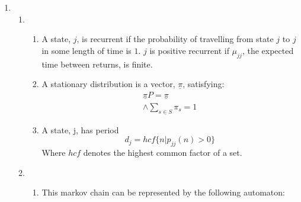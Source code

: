 \documentclass{article}
\begin{document}
\begin{enumerate}
\begin{enumerate}
\end{enumerate}
\clearpage
\item
\begin{enumerate}
\item
\begin{enumerate}
\item A state, $j$, is recurrent if the probability of travelling from state $j$
to $j$ in some length of time is $1$. $j$ is positive recurrent if $\mu_{jj}$,
the expected time between returns, is finite.

\item A stationary distribution is a vector, $\underline{\pi}$, satisfying:
\begin{align*}
\underline{\pi} P = \underline{\pi} \\
\wedge \sum_{s \in S} \pi_s = 1
\end{align*}
\item
A state, j, has period
$$
d_j = hcf\{n|p_{jj}(n)>0\}
$$
Where $hcf$ denotes the highest common factor of a set.
\end{enumerate}
\item
\begin{enumerate}
\item
This markov chain can be represented by the following automaton:



\end{enumerate}
\end{enumerate}
\end{enumerate}
\end{document}
